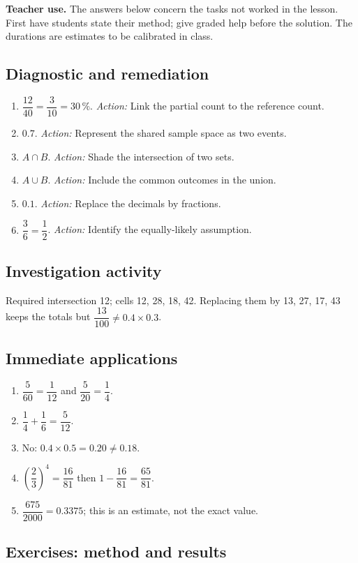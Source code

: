 \label{C05-CORR}
\textbf{Teacher use.} The answers below concern the tasks not worked in the lesson. First have students state their method; give graded help before the solution. The durations are estimates to be calibrated in class.
\subsection*{Diagnostic and remediation}
\begin{enumerate}
\item $\dfrac{12}{40}=\dfrac{3}{10}=30\,\%$. \textit{Action:} Link the partial count to the reference count.
\item $0.7$. \textit{Action:} Represent the shared sample space as two events.
\item $A\cap B$. \textit{Action:} Shade the intersection of two sets.
\item $A\cup B$. \textit{Action:} Include the common outcomes in the union.
\item $0.1$. \textit{Action:} Replace the decimals by fractions.
\item $\dfrac{3}{6}=\dfrac{1}{2}$. \textit{Action:} Identify the equally-likely assumption.
\end{enumerate}
\subsection*{Investigation activity}
Required intersection 12; cells 12, 28, 18, 42. Replacing them by 13, 27, 17, 43 keeps the totals but $\dfrac{13}{100}\ne 0.4\times 0.3$.
\subsection*{Immediate applications}
\begin{enumerate}
\item $\dfrac{5}{60}=\dfrac{1}{12}$ and $\dfrac{5}{20}=\dfrac{1}{4}$.
\item $\dfrac{1}{4}+\dfrac{1}{6}=\dfrac{5}{12}$.
\item No: $0.4\times0.5=0.20\ne0.18$.
\item $(\dfrac{2}{3})^4=\dfrac{16}{81}$ then $1-\dfrac{16}{81}=\dfrac{65}{81}$.
\item $\dfrac{675}{2000}=0.3375$; this is an estimate, not the exact value.
\end{enumerate}
\subsection*{Exercises: method and results}

